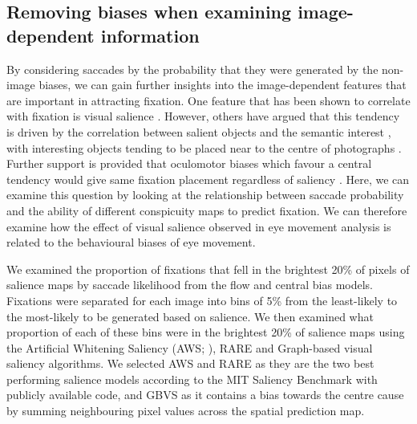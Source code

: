 \subsection{Removing biases when examining image-dependent information}

By considering saccades by the probability that they were generated by the non-image biases, we can gain further insights into the image-dependent features that are important in attracting fixation. One feature that has been shown to correlate with fixation is visual salience \citep{parkhurst2002}. However, others have argued that this tendency is driven by the correlation between salient objects and the semantic interest \citep{henderson2007}, with interesting objects tending to be placed near to the centre of photographs \citep{tatler2007}. Further support is provided that oculomotor biases which favour a central tendency would give same fixation placement regardless of saliency \citep{tatler-vincent2009}. Here, we can examine this question by looking at the relationship between saccade probability and the ability of different conspicuity maps to predict fixation. We can therefore examine how the effect of visual salience observed in eye movement analysis is related to the behavioural biases of eye movement.

We examined the proportion of fixations that fell in the brightest 20\% of pixels of salience maps by saccade likelihood from the flow and central bias models. Fixations were separated for each image into bins of 5\% from the least-likely to the most-likely to be generated based on salience. We then examined what proportion of each of these bins were in the brightest 20\% of salience maps using the Artificial Whitening Saliency (AWS; \cite{garciadiaz2012}), RARE \citep{riche2013} and Graph-based visual saliency \citep[GBVS;][]{harel2006} algorithms. We selected AWS and RARE as they are the two best performing salience models according to the MIT Saliency Benchmark \citep{mit-saliency-benchmark,judd2012} with publicly available code, and GBVS as it contains a bias towards the centre cause by summing neighbouring pixel values across the spatial prediction map.

